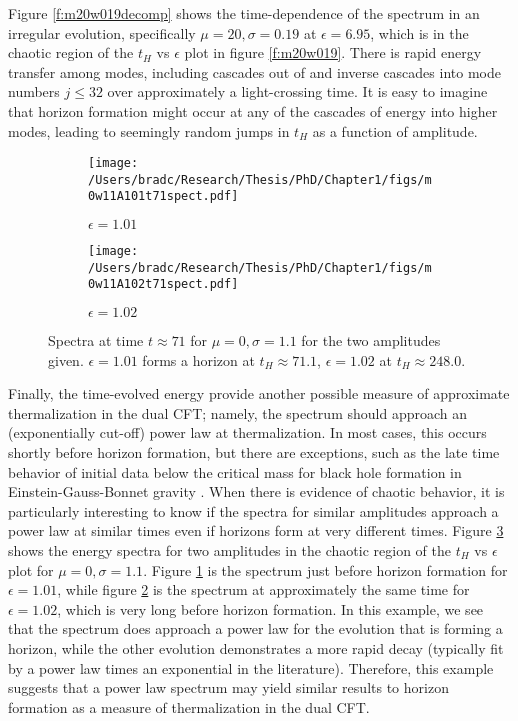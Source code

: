 \documentclass[../PhD.tex]{subfiles}
\begin{document}
Figure \ref{f:m20w019decomp} shows the time-dependence of the spectrum
in an irregular evolution, specifically $\mu=20,\sigma=0.19$
at $\epsilon=6.95$, which is in the chaotic region of the $t_H$ vs $\epsilon$
plot in figure \ref{f:m20w019}.  There is rapid energy transfer among modes,
including cascades out of and inverse cascades into mode numbers $j\leq 32$
over approximately a light-crossing time.  It is easy to imagine that
horizon formation might occur at any of the cascades of energy into higher
modes, leading to seemingly random jumps in $t_H$ as a function of amplitude.

\begin{figure}[!t]
\centering
\begin{subfigure}[t]{0.47\textwidth}
\texttt{[image: /Users/bradc/Research/Thesis/PhD/Chapter1/figs/m0w11A101t71spect.pdf]}
\caption{$\epsilon=1.01$}
\label{f:m0w11e101}
\end{subfigure}
\begin{subfigure}[t]{0.47\textwidth}
\texttt{[image: /Users/bradc/Research/Thesis/PhD/Chapter1/figs/m0w11A102t71spect.pdf]}
\caption{$\epsilon=1.02$}
\label{f:m0w11e102}
\end{subfigure}
\caption[Late-time spectra]{Spectra at time $t\approx 71$ for $\mu=0,\sigma=1.1$ for the two
amplitudes given.  $\epsilon=1.01$ forms a horizon at $t_H\approx 71.1$,
$\epsilon=1.02$ at $t_H\approx 248.0$.}
\label{f:chaoticspect}
\end{figure}

Finally, the time-evolved energy provide another possible measure of
approximate thermalization in the dual CFT; namely, the spectrum should
approach an (exponentially cut-off) power law at thermalization.  In most
cases, this occurs shortly before horizon formation, but there are exceptions,
such as the late time behavior of initial data below the critical mass
for black hole formation in Einstein-Gauss-Bonnet gravity \cite{1608.05402}.
When there is evidence of 
chaotic behavior, it is particularly interesting to know if
the spectra for similar amplitudes approach a power law at similar times
even if horizons form at very different times.  Figure \ref{f:chaoticspect}
shows the energy spectra for two amplitudes in the chaotic region of
the $t_H$ vs $\epsilon$ plot for $\mu=0,\sigma=1.1$.  Figure \ref{f:m0w11e101}
is the spectrum just before horizon formation for $\epsilon=1.01$,
while figure \ref{f:m0w11e102} is the spectrum at approximately the same
time for $\epsilon=1.02$, which is very long before horizon formation.  In
this example, we see that the spectrum does approach a power law for the
evolution that is forming a horizon, while the other evolution demonstrates
a more rapid decay (typically fit by a power law times an exponential in
the literature).  Therefore, this example suggests that
a power law spectrum may yield similar results to horizon formation as a
measure of thermalization in the dual CFT.
\end{document}
